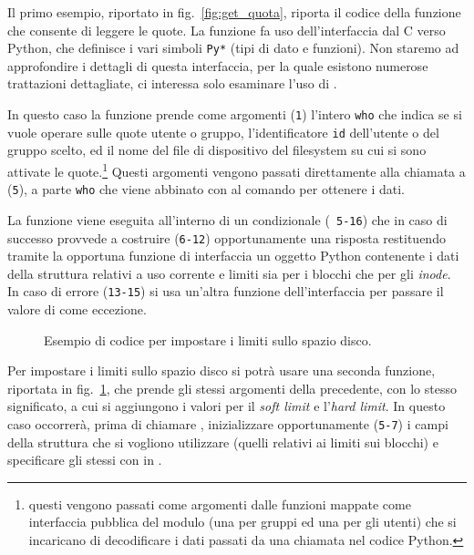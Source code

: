 Il primo esempio, riportato in fig.~\ref{fig:get_quota}, riporta il codice
della funzione che consente di leggere le quote. La funzione fa uso
dell'interfaccia dal C verso Python, che definisce i vari simboli \texttt{Py*}
(tipi di dato e funzioni). Non staremo ad approfondire i dettagli di questa
interfaccia, per la quale esistono numerose trattazioni dettagliate, ci
interessa solo esaminare l'uso di . 

In questo caso la funzione prende come argomenti (\texttt{\small 1}) l'intero
\texttt{who} che indica se si vuole operare sulle quote utente o gruppo,
l'identificatore \texttt{id} dell'utente o del gruppo scelto, ed il nome del
file di dispositivo del filesystem su cui si sono attivate le
quote.\footnote{questi vengono passati come argomenti dalle funzioni mappate
  come interfaccia pubblica del modulo (una per gruppi ed una per gli utenti)
  che si incaricano di decodificare i dati passati da una chiamata nel codice
  Python.} Questi argomenti vengono passati direttamente alla chiamata a
 (\texttt{\small 5}), a parte \texttt{who} che viene abbinato
con  al comando  per ottenere i dati.

La funzione viene eseguita all'interno di un condizionale (\texttt{\small
  5-16}) che in caso di successo provvede a costruire (\texttt{\small 6-12})
opportunamente una risposta restituendo tramite la opportuna funzione di
interfaccia un oggetto Python contenente i dati della struttura 
relativi a uso corrente e limiti sia per i blocchi che per gli
\textit{inode}. In caso di errore (\texttt{\small 13-15}) si usa un'altra
funzione dell'interfaccia per passare il valore di  come eccezione.

\begin{figure}[!htbp]
  \footnotesize \centering
  \begin{minipage}[c]{\codesamplewidth}
  \end{minipage}
  \caption{Esempio di codice per impostare i limiti sullo spazio disco.}
  \label{fig:set_block_quota}
\end{figure}

Per impostare i limiti sullo spazio disco si potrà usare una seconda funzione,
riportata in fig.~\ref{fig:set_block_quota}, che prende gli stessi argomenti
della precedente, con lo stesso significato, a cui si aggiungono i valori per
il \textit{soft limit} e l'\textit{hard limit}. In questo caso occorrerà,
prima di chiamare , inizializzare opportunamente
(\texttt{\small 5-7}) i campi della struttura  che si vogliono
utilizzare (quelli relativi ai limiti sui blocchi) e specificare gli stessi
con  in . 

